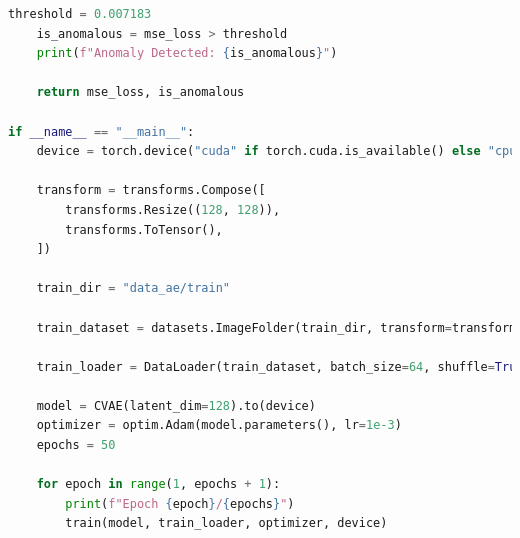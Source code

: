 \begin{lstlisting}[language=Python]
    threshold = 0.007183
    is_anomalous = mse_loss > threshold
    print(f"Anomaly Detected: {is_anomalous}")

    return mse_loss, is_anomalous

if __name__ == "__main__":
    device = torch.device("cuda" if torch.cuda.is_available() else "cpu")

    transform = transforms.Compose([
        transforms.Resize((128, 128)),
        transforms.ToTensor(),
    ])

    train_dir = "data_ae/train"

    train_dataset = datasets.ImageFolder(train_dir, transform=transform)

    train_loader = DataLoader(train_dataset, batch_size=64, shuffle=True, num_workers=4)

    model = CVAE(latent_dim=128).to(device)
    optimizer = optim.Adam(model.parameters(), lr=1e-3)
    epochs = 50

    for epoch in range(1, epochs + 1):
        print(f"Epoch {epoch}/{epochs}")
        train(model, train_loader, optimizer, device)

\end{lstlisting}

\newpage
